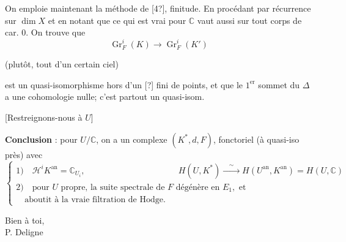 \documentclass[11pt,a4paper]{article}
\DeclareMathOperator{\Gr}{Gr}
\begin{document}
\vspace{0.3cm}

On emploie maintenant la m\'ethode de [4?], finitude. En proc\'edant par r\'ecurrence sur $\dim X$ et en notant que ce qui est vrai pour $\mathbb{C}$ vaut aussi sur tout corps de car. $0$. On trouve que
\[
\Gr_{F}^{i}(K) \longrightarrow \Gr_{F}^{i}(K')
\]
\begin{flushright}
\small (plut\^ot, tout d'un certain ciel)
\end{flushright}
est un quasi-isomorphisme hors d'un [?] fini de points, et que le $1^{\text{er}}$ sommet du $\Delta$ a une cohomologie nulle; c'est partout un quasi-isom.

\vspace{0.3cm}

\hspace*{2cm} \small [Restreignons-nous \`a $U$]

\vspace{0.3cm}

\noindent \textbf{Conclusion} : pour $U/\mathbb{C}$, on a un complexe $(K^{*}, d, F)$, fonctoriel (\`a quasi-iso pr\`es) avec
\[
\begin{cases}
1)\quad \mathcal{H}^{i} K^{\text{an}} = \mathbb{C}_{U_{i}}, & H(U, K^{*}) \xrightarrow{\quad\sim\quad} H(U^{\text{an}}, K^{\text{an}}) = H(U, \mathbb{C}) \\[2mm]
2)\quad \text{pour } U \text{ propre, la suite spectrale de } F \text{ d\'eg\'en\`ere en } E_{1}, \text{ et} \\
\quad \text{aboutit \`a la vraie filtration de Hodge.}
\end{cases}
\]

\vspace{1cm}

\begin{flushright}
Bien \`a toi, \\[1mm]
P. Deligne
\end{flushright}
\end{document}
